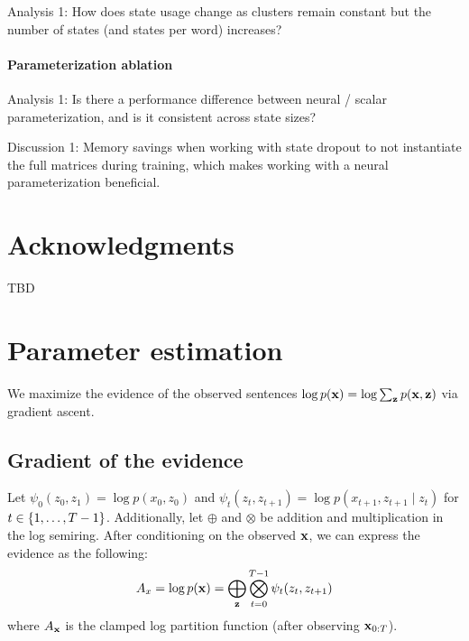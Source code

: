 \documentclass[11pt,a4paper]{article}
\begin{document}
Analysis 1: How does state usage change as clusters remain constant
but the number of states (and states per word) increases?

\paragraph{Parameterization ablation}
Analysis 1: Is there a performance difference between neural / scalar parameterization,
and is it consistent across state sizes?

Discussion 1: Memory savings when working with state dropout to not instantiate the
full matrices during training, which makes working with a neural parameterization
beneficial.



\section*{Acknowledgments}
TBD




\appendix

\section{Parameter estimation}
We maximize the evidence of the observed sentences
$\log p(\mathbf{x}) = \log \sum_{\mathbf{z}} p(\mathbf{x}, \mathbf{z})$
via gradient ascent.

\subsection{Gradient of the evidence}
Let $\psi_0(z_0, z_1) = \log p(x_0, z_0)$ and
$\psi_t(z_{t}, z_{t+1}) = \log p(x_{t+1}, z_{t+1} \mid z_{t})$ for $t \in \left\{1, \ldots, T-1\right\}$.
Additionally, let $\oplus$ and $\otimes$ be addition and multiplication in the log semiring.
After conditioning on the observed $\mathbf{x}$, we can express the evidence as the following:
\begin{equation}
\label{eqn:evidence}
A_x = \log p(\mathbf{x}) = \bigoplus_{\mathbf{z}}\bigotimes_{t=0}^{T-1} \psi_t(z_t, z_{t+1})
\end{equation}
where $A_{\mathbf{x}}$ is the clamped log partition function (after observing $\mathbf{x}_{0:T}$).
\end{document}
